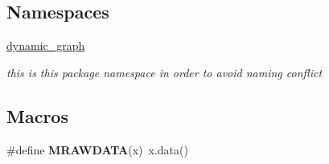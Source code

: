 \subsection*{Namespaces}
\begin{DoxyCompactItemize}
\item 
 \hyperlink{namespacedynamic__graph}{dynamic\+\_\+graph}
\begin{DoxyCompactList}\small\item\em this is this package namespace in order to avoid naming conflict \end{DoxyCompactList}\end{DoxyCompactItemize}
\subsection*{Macros}
\begin{DoxyCompactItemize}
\item 
\#define {\bfseries M\+R\+A\+W\+D\+A\+TA}(x)~x.\+data()\hypertarget{matrix__geometry_8hh_a57a66b4c84cff81707e398b940e1ef68}{}\label{matrix__geometry_8hh_a57a66b4c84cff81707e398b940e1ef68}

\end{DoxyCompactItemize}
